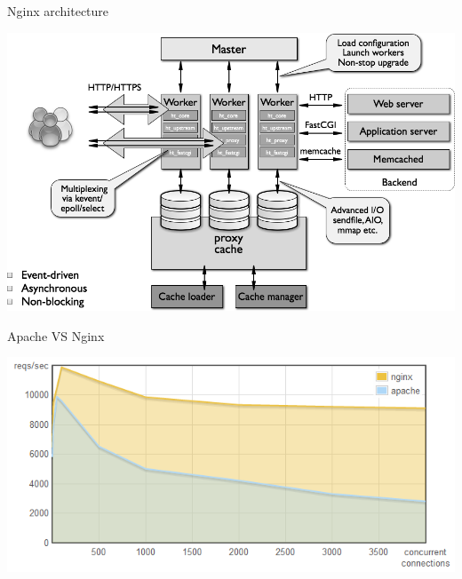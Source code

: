 \begin{frame}{Nginx architecture}
  \begin{center}
    \includegraphics[width=\textwidth,keepaspectratio]{sources/images/nginx_architecture.png}
  \end{center}
\end{frame}

\begin{frame}{Apache VS Nginx}
  \begin{center}
    \includegraphics[width=\textwidth,keepaspectratio]{sources/images/nginx-apache-reqs-sec.png}
  \end{center}
\end{frame}